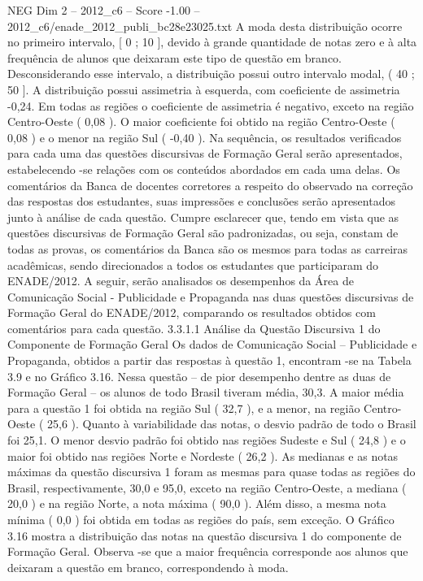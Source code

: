 \begin{textsample}{NEG Dim 2 – 2012\_c6 – Score -1.00 – 2012\_c6/enade\_2012\_publi\_bc28e23025.txt}
A moda desta distribuição ocorre no primeiro intervalo, [ 0 ; 10 ], devido à grande quantidade de notas zero e à alta frequência de alunos que deixaram este tipo de questão em branco.
Desconsiderando esse intervalo, a distribuição possui outro intervalo modal, ( 40 ; 50 ].
A distribuição possui assimetria à esquerda, com coeficiente de assimetria -0,24.
Em todas as regiões o coeficiente de assimetria é negativo, exceto na região Centro-Oeste ( 0,08 ).
O maior coeficiente foi obtido na região Centro-Oeste ( 0,08 ) e o menor na região Sul ( -0,40 ).
Na sequência, os resultados verificados para cada uma das questões discursivas de Formação Geral serão apresentados, estabelecendo -se relações com os conteúdos abordados em cada uma delas.
Os comentários da Banca de docentes corretores a respeito do observado na correção das respostas dos estudantes, suas impressões e conclusões serão apresentados junto à análise de cada questão.
Cumpre esclarecer que, tendo em vista que as questões discursivas de Formação Geral são padronizadas, ou seja, constam de todas as provas, os comentários da Banca são os mesmos para todas as carreiras acadêmicas, sendo direcionados a todos os estudantes que participaram do ENADE/2012.
A seguir, serão analisados os desempenhos da Área de Comunicação Social - Publicidade e Propaganda nas duas questões discursivas de Formação Geral do ENADE/2012, comparando os resultados obtidos com comentários para cada questão. 3.3.1.1 Análise da Questão Discursiva 1 do Componente de Formação Geral Os dados de Comunicação Social – Publicidade e Propaganda, obtidos a partir das respostas à questão 1, encontram -se na Tabela 3.9 e no Gráfico 3.16.
Nessa questão – de pior desempenho dentre as duas de Formação Geral – os alunos de todo Brasil tiveram média, 30,3.
A maior média para a questão 1 foi obtida na região Sul ( 32,7 ), e a menor, na região Centro-Oeste ( 25,6 ).
Quanto à variabilidade das notas, o desvio padrão de todo o Brasil foi 25,1.
O menor desvio padrão foi obtido nas regiões Sudeste e Sul ( 24,8 ) e o maior foi obtido nas regiões Norte e Nordeste ( 26,2 ).
As medianas e as notas máximas da questão discursiva 1 foram as mesmas para quase todas as regiões do Brasil, respectivamente, 30,0 e 95,0, exceto na região Centro-Oeste, a mediana ( 20,0 ) e na região Norte, a nota máxima ( 90,0 ).
Além disso, a mesma nota mínima ( 0,0 ) foi obtida em todas as regiões do país, sem exceção.
O Gráfico 3.16 mostra a distribuição das notas na questão discursiva 1 do componente de Formação Geral.
Observa -se que a maior frequência corresponde aos alunos que deixaram a questão em branco, correspondendo à moda.

\end{textsample}
